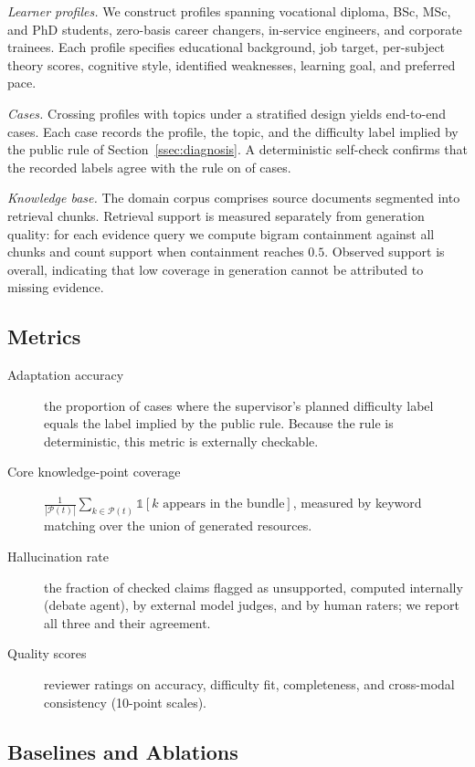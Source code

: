 \emph{Learner profiles.} We construct  profiles spanning vocational
diploma, BSc, MSc, and PhD students, zero-basis career changers, in-service
engineers, and corporate trainees. Each profile specifies educational
background, job target, per-subject theory scores, cognitive style, identified
weaknesses, learning goal, and preferred pace.

\emph{Cases.} Crossing profiles with topics under a stratified design yields
 end-to-end cases. Each case records the profile, the topic, and the
difficulty label implied by the public rule of Section~\ref{ssec:diagnosis}.
A deterministic self-check confirms that the recorded labels agree with the
rule on  of cases.

\emph{Knowledge base.} The domain corpus comprises  source documents
segmented into  retrieval chunks. Retrieval support is measured
separately from generation quality: for each evidence query we compute
bigram containment against all chunks and count support when containment
reaches $0.5$. Observed support is  overall, indicating that low
coverage in generation cannot be attributed to missing evidence.

\subsection{Metrics}

\begin{description}
\item[Adaptation accuracy] the proportion of cases where the supervisor's
planned difficulty label equals the label implied by the public rule. Because
the rule is deterministic, this metric is externally checkable.
\item[Core knowledge-point coverage] $\frac{1}{|\mathcal{P}(t)|}\sum_{k \in
\mathcal{P}(t)} \mathbb{1}[k \text{ appears in the bundle}]$, measured by
keyword matching over the union of generated resources.
\item[Hallucination rate] the fraction of checked claims flagged as
unsupported, computed internally (debate agent), by external model judges, and
by human raters; we report all three and their agreement.
\item[Quality scores] reviewer ratings on accuracy, difficulty fit,
completeness, and cross-modal consistency (10-point scales).
\end{description}

\subsection{Baselines and Ablations}
\label{ssec:baselines}

